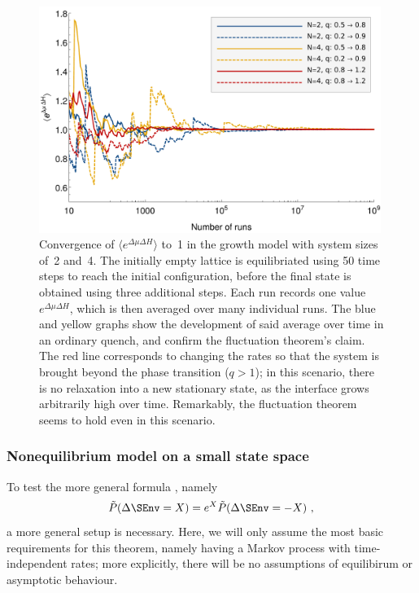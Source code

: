 \begin{figure}[htbp]
	\centering
	\includegraphics[width=30em]{figures/growth_process}
	\caption[]{Convergence of \(\langle e^{\Delta\mu\Delta H}\rangle\) to~1 in the growth model with system sizes of~2 and~4. The initially empty lattice is equilibriated using 50 time steps to reach the initial configuration, before the final state is obtained using three additional steps. Each run records one value \(e^{\Delta\mu\Delta H}\), which is then averaged over many individual runs. The blue and yellow graphs show the development of said average over time in an ordinary quench, and confirm the fluctuation theorem's claim. The red line corresponds to changing the rates so that the system is brought beyond the phase transition (\(q > 1\)); in this scenario, there is no relaxation into a new stationary state, as the interface grows arbitrarily high over time. Remarkably, the fluctuation theorem seems to hold even in this scenario.}
	\label{fig:growth_process_plot}
\end{figure}




\subsubsection{Nonequilibrium model on a small state space}

To test the more general formula \label{eqn:SEnv fluctuation theorem}, namely
%
\begin{equation*}
	\tilde P(\Delta\SEnv = X) = e^X \tilde P(\Delta\SEnv = -X) ~,
\end{equation*}
%
a more general setup is necessary. Here, we will only assume the most basic requirements for this theorem, namely having a Markov process with time-independent rates; more explicitly, there will be no assumptions of equilibirum or asymptotic behaviour.

